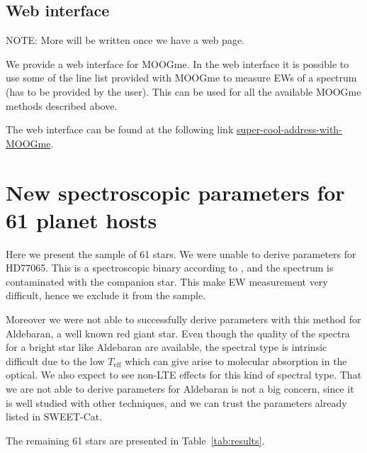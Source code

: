 \documentclass{aa}
\begin{document}
\subsection{Web interface}
\label{sub:Web interface}
NOTE: More will be written once we have a web page.

We provide a web interface for MOOGme. In the web interface it is possible to
use some of the line list provided with MOOGme to measure EWs of a spectrum (has
to be provided by the user). This can be used for all the available MOOGme
methods described above.

The web interface can be found at the following link
\url{super-cool-address-with-MOOGme}.



\section{New spectroscopic parameters for 61 planet hosts}
\label{sec:results}
Here we present the sample of 61 stars. We were unable to derive parameters for
HD77065. This is a spectroscopic binary according to \cite{Pourbaix2004}, and
the spectrum is contaminated with the companion star. This make EW measurement
very difficult, hence we exclude it from the sample.

Moreover we were not able to successfully derive parameters with this method
for Aldebaran, a well known red giant star. Even though the quality of the
spectra for a bright star like Aldebaran are available, the spectral type
is intrinsic difficult due to the low $T_\mathrm{eff}$ which can give arise to
molecular absorption in the optical. We also expect to see non-LTE effects for
this kind of spectral type. That we are not able to derive parameters for
Aldebaran is not a big concern, since it is well studied with other techniques,
and we can trust the parameters already listed in SWEET-Cat.

The remaining 61 stars are presented in Table~\ref{tab:results}.
\end{document}
